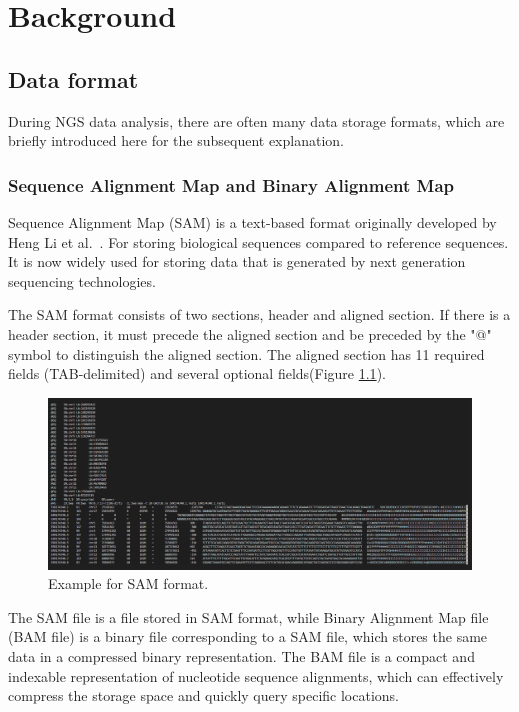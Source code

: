 \documentclass[PhD]{PHlab-thesis}
\begin{document}
\chapter{Background}
\section{Data format}
During NGS data analysis, there are often many data storage formats, which are briefly introduced here for the subsequent explanation.
\subsection{Sequence Alignment Map and Binary Alignment Map}
Sequence Alignment Map (SAM) is a text-based format originally developed by Heng Li et al.~\cite{li2009SAMtools}. For storing biological sequences compared to reference sequences. It is now widely used for storing data that is generated by next generation sequencing technologies.

The SAM format consists of two sections, header and aligned section. If there is a header section, it must precede the aligned section and be preceded by the "@" symbol to distinguish the aligned section. The aligned section has 11 required fields (TAB-delimited) and several optional fields(Figure \ref{fig:SAM format}).

\begin{figure}[h!]
	\centering
	\includegraphics[scale=0.3]{figures/Example_for_SAM_file.png}
	\caption{Example for SAM format.}
	\label{fig:SAM format} %
\end{figure}

The SAM file is a file stored in SAM format, while Binary Alignment Map file (BAM file) is a binary file corresponding to a SAM file, which stores the same data in a compressed binary representation. The BAM file is a compact and indexable representation of nucleotide sequence alignments, which can effectively compress the storage space and quickly query specific locations.
\end{document}
